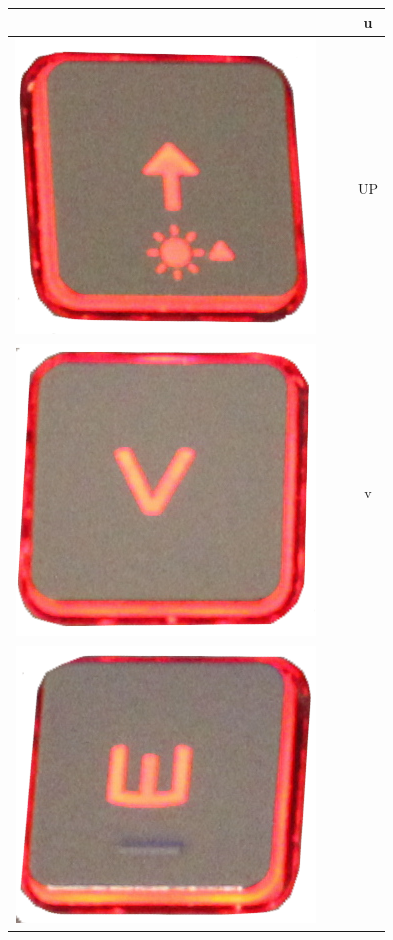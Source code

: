 \begin{longtable}{cccc}
\begin{minipage}[c]{.3\textwidth}
\vspace{0.2cm}
\end{minipage} & & & u\\
\hline
\begin{minipage}[c]{.3\textwidth}
\vspace{0.2cm}
\includegraphics[scale=0.1]{Images/KeyMapping/UP}
\vspace{0.2cm}
\end{minipage} & & & UP\\
\hline
\begin{minipage}[c]{.3\textwidth}
\vspace{0.2cm}
\includegraphics[scale=0.1]{Images/KeyMapping/v}
\vspace{0.2cm}
\end{minipage} & & & v\\
\hline
\begin{minipage}[c]{.3\textwidth}
\vspace{0.2cm}
\includegraphics[scale=0.1]{Images/KeyMapping/w}

\end{minipage}
\end{longtable}
